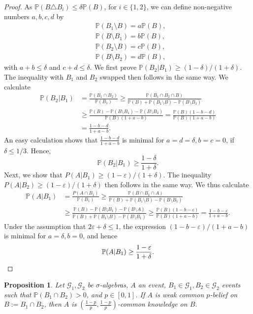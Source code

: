 \documentclass[a4paper, 10pt]{article}
\numberwithin{theorem}{section}
\newtheorem{prop}[theorem]{Proposition}
\theoremstyle{definition}
\newcommand{\G}{\mathcal{G}}
\renewcommand{\epsilon}{\varepsilon}
\renewcommand{\P}{\mathbb{P}}
\begin{document}
\begin{proof}
	As $\P(B \triangle B_i) \leq \delta \P(B)$, for $i \in \{1,2\}$, we can define non-negative numbers $a,b,c,d$ by 
	\begin{align*}
	&\P(B_1 \setminus B) = a \P(B),	\\
	&\P(B \setminus B_1) = b \P(B),	\\
	&\P(B_2 \setminus B) = c \P(B),	\\
	&\P(B \setminus B_2) = d \P(B),	
	\end{align*}
	with $a+b \leq \delta$ and $c+d \leq \delta$.
	We first prove $\P(B_2|B_1) \geq (1-\delta)/(1+\delta)$.  The inequality with $B_1$ and $B_2$ swapped then follows in the same way. We calculate
	\begin{align*}
		\P(B_2|B_1) &= \frac{\P(B_1\cap B_2)}{\P(B_1)} \geq \frac{\P(B_1\cap B_2 \cap B)}{\P(B)+\P(B_1 \setminus B)- \P(B \setminus B_1)} \\
		&\geq \frac{\P(B) -  \P(B\setminus B_1) -\P(B \setminus B_2)  }{\P(B)(1+a-b)} = \frac{\P(B) (1-b-d) }{\P(B)(1+a-b)} \\
		&= \frac{1-b-d}{1+a-b}.
	\end{align*}
	An easy calculation shows that $\frac{1-b-d}{1+a-b}$ is minimal for $a=d=\delta, b=c=0$, if $\delta \leq 1/3$. Hence,
	$$	\P(B_2|B_1) \geq \frac{1-\delta}{1+\delta}.$$
	Next, we show that $P(A|B_1) \geq (1-\epsilon)/(1+\delta)$. The inequality $P(A|B_2) \geq (1-\epsilon)/(1+\delta)$ then follows in the same way. We thus calculate 
	\begin{align*}
		\P(A|B_1) &= \frac{P(A\cap B_1)}{\P(B_1)} \geq \frac{\P(B \cap B_1 \cap A)}{\P(B) + \P(B_1 \setminus B) - \P(B \setminus B_1)} \\
		&\geq \frac{\P(B)- \P(B \setminus B_1) - \P(B \setminus A)}{\P(B) + \P(B_1 \setminus B) - \P(B \setminus B_1)} \geq \frac{\P(B)(1-b-\epsilon)}{\P(B)(1+a-b)}=\frac{1-b-\epsilon}{1+a-b}.
	\end{align*}
	Under the assumption that $2\epsilon + \delta \leq 1$, the expression $(1-b-\epsilon)/(1+a-b)$ is minimal for $a=\delta,b=0$, and hence
	\[\P(A|B_1) \geq \frac{1-\epsilon}{1+\delta}. \qedhere\]

\end{proof}

\begin{prop}\label{lemma:p_to_delta}
	Let $\G_1,\G_2$ be $\sigma$-algebras, $A$ an event, $B_1 \in \G_1, B_2 \in \G_2$ events such that $\P(B_1 \cap B_2)>0$, and $p \in [0,1]$. 
	If $A$ is weak common $p$-belief on $B:=B_1\cap B_2$, then $A$ is $(\frac{1-p}{p},\frac{1-p}{p})$-common knowledge on $B$.
\end{prop}
\end{document}

